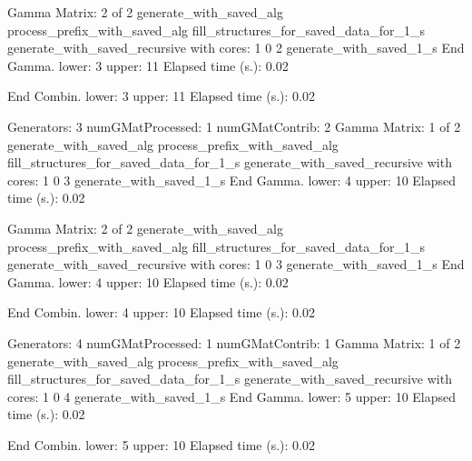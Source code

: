 \documentclass[]{article}
\newenvironment{Shaded}{}{}
\newcommand{\BuiltInTok}[1]{#1}
\newcommand{\ExtensionTok}[1]{#1}
\newcommand{\NormalTok}[1]{#1}
\begin{document}
\begin{Shaded}
\begin{Highlighting}[]
    \ExtensionTok{Gamma}\NormalTok{ Matrix: 2 of 2 }
    \ExtensionTok{generate_with_saved_alg}
    \ExtensionTok{process_prefix_with_saved_alg}
    \ExtensionTok{fill_structures_for_saved_data_for_1_s}
    \ExtensionTok{generate_with_saved_recursive}\NormalTok{ with cores: 1  0 2}
    \ExtensionTok{generate_with_saved_1_s}
    \ExtensionTok{End}\NormalTok{ Gamma. lower:  3  upper: 11        Elapsed time (s.)}\BuiltInTok{:}\NormalTok{ 0.02}

  \ExtensionTok{End}\NormalTok{ Combin.  lower:  3  upper: 11        Elapsed time (s.)}\BuiltInTok{:}\NormalTok{ 0.02}

  \ExtensionTok{Generators}\NormalTok{: 3}
  \ExtensionTok{numGMatProcessed}\NormalTok{: 1}
  \ExtensionTok{numGMatContrib}\NormalTok{:   2}
    \ExtensionTok{Gamma}\NormalTok{ Matrix: 1 of 2 }
    \ExtensionTok{generate_with_saved_alg}
    \ExtensionTok{process_prefix_with_saved_alg}
    \ExtensionTok{fill_structures_for_saved_data_for_1_s}
    \ExtensionTok{generate_with_saved_recursive}\NormalTok{ with cores: 1  0 3}
    \ExtensionTok{generate_with_saved_1_s}
    \ExtensionTok{End}\NormalTok{ Gamma. lower:  4  upper: 10        Elapsed time (s.)}\BuiltInTok{:}\NormalTok{ 0.02}

    \ExtensionTok{Gamma}\NormalTok{ Matrix: 2 of 2 }
    \ExtensionTok{generate_with_saved_alg}
    \ExtensionTok{process_prefix_with_saved_alg}
    \ExtensionTok{fill_structures_for_saved_data_for_1_s}
    \ExtensionTok{generate_with_saved_recursive}\NormalTok{ with cores: 1  0 3}
    \ExtensionTok{generate_with_saved_1_s}
    \ExtensionTok{End}\NormalTok{ Gamma. lower:  4  upper: 10        Elapsed time (s.)}\BuiltInTok{:}\NormalTok{ 0.02}

  \ExtensionTok{End}\NormalTok{ Combin.  lower:  4  upper: 10        Elapsed time (s.)}\BuiltInTok{:}\NormalTok{ 0.02}

  \ExtensionTok{Generators}\NormalTok{: 4}
  \ExtensionTok{numGMatProcessed}\NormalTok{: 1}
  \ExtensionTok{numGMatContrib}\NormalTok{:   1}
    \ExtensionTok{Gamma}\NormalTok{ Matrix: 1 of 2 }
    \ExtensionTok{generate_with_saved_alg}
    \ExtensionTok{process_prefix_with_saved_alg}
    \ExtensionTok{fill_structures_for_saved_data_for_1_s}
    \ExtensionTok{generate_with_saved_recursive}\NormalTok{ with cores: 1  0 4}
    \ExtensionTok{generate_with_saved_1_s}
    \ExtensionTok{End}\NormalTok{ Gamma. lower:  5  upper: 10        Elapsed time (s.)}\BuiltInTok{:}\NormalTok{ 0.02}

  \ExtensionTok{End}\NormalTok{ Combin.  lower:  5  upper: 10        Elapsed time (s.)}\BuiltInTok{:}\NormalTok{ 0.02}


\end{Highlighting}
\end{Shaded}
\end{document}
